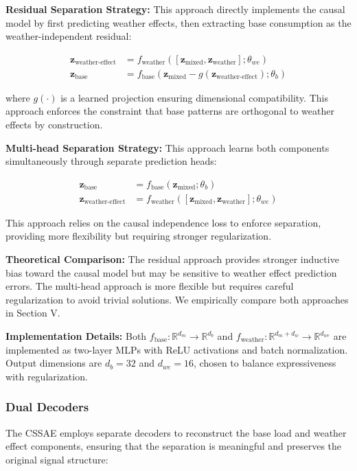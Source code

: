 \documentclass[journal]{IEEEtran}
\begin{document}
\textbf{Residual Separation Strategy:} This approach directly implements the causal model by first predicting weather effects, then extracting base consumption as the weather-independent residual:

\begin{align}
\mathbf{z}_{\text{weather-effect}} &= f_{\text{weather}}([\mathbf{z}_{\text{mixed}}, \mathbf{z}_{\text{weather}}]; \theta_{we}) \label{eq:weather_effect}\\
\mathbf{z}_{\text{base}} &= f_{\text{base}}(\mathbf{z}_{\text{mixed}} - g(\mathbf{z}_{\text{weather-effect}}); \theta_b) \label{eq:base_extraction}
\end{align}

where $g(\cdot)$ is a learned projection ensuring dimensional compatibility. This approach enforces the constraint that base patterns are orthogonal to weather effects by construction.

\textbf{Multi-head Separation Strategy:} This approach learns both components simultaneously through separate prediction heads:

\begin{align}
\mathbf{z}_{\text{base}} &= f_{\text{base}}(\mathbf{z}_{\text{mixed}}; \theta_b) \label{eq:multihead_base}\\
\mathbf{z}_{\text{weather-effect}} &= f_{\text{weather}}([\mathbf{z}_{\text{mixed}}, \mathbf{z}_{\text{weather}}]; \theta_{we}) \label{eq:multihead_weather}
\end{align}

This approach relies on the causal independence loss to enforce separation, providing more flexibility but requiring stronger regularization.

\textbf{Theoretical Comparison:} The residual approach provides stronger inductive bias toward the causal model but may be sensitive to weather effect prediction errors. The multi-head approach is more flexible but requires careful regularization to avoid trivial solutions. We empirically compare both approaches in Section V.

\textbf{Implementation Details:} Both $f_{\text{base}}: \mathbb{R}^{d_m} \rightarrow \mathbb{R}^{d_b}$ and $f_{\text{weather}}: \mathbb{R}^{d_m + d_w} \rightarrow \mathbb{R}^{d_{we}}$ are implemented as two-layer MLPs with ReLU activations and batch normalization. Output dimensions are $d_b = 32$ and $d_{we} = 16$, chosen to balance expressiveness with regularization.

\subsubsection{Dual Decoders}
The CSSAE employs separate decoders to reconstruct the base load and weather effect components, ensuring that the separation is meaningful and preserves the original signal structure:
\end{document}
